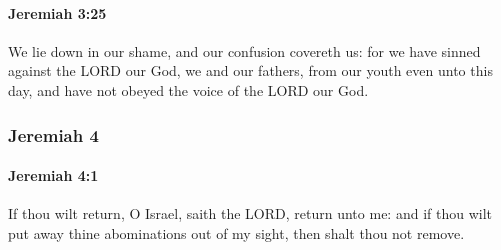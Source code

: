 		\paragraph{Jeremiah 3:25} %
			\label{JEREMIAH-3-25}

			We lie down in our shame, and our confusion covereth us: for we have sinned against the LORD our God, we and our fathers, from our youth even unto this day, and have not obeyed the voice of the LORD our God.

	\subsubsection{Jeremiah 4} %
		\label{JEREMIAH-4}

		\paragraph{Jeremiah 4:1} %
			\label{JEREMIAH-4-1}

			If thou wilt return, O Israel, saith the LORD, return unto me: and if thou wilt put away thine abominations out of my sight, then shalt thou not remove.

